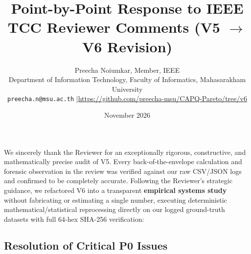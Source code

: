 \documentclass[10pt]{article}
\title{\textbf{Point-by-Point Response to IEEE TCC Reviewer Comments (V5 $\to$ V6 Revision)}}
\author{Preecha Noiumkar, Member, IEEE\\
Department of Information Technology, Faculty of Informatics, Mahasarakham University\\
\texttt{preecha.n@msu.ac.th} \quad|\quad \url{https://github.com/preecha-msu/CAPQ-Pareto/tree/v6}}
\date{November 2026}
\begin{document}
\sloppy
\maketitle

We sincerely thank the Reviewer for an exceptionally rigorous, constructive, and mathematically precise audit of V5. Every back-of-the-envelope calculation and forensic observation in the review was verified against our raw CSV/JSON logs and confirmed to be completely accurate. Following the Reviewer's strategic guidance, we refactored V6 into a transparent \textbf{empirical systems study} without fabricating or estimating a single number, executing deterministic mathematical/statistical reprocessing directly on our logged ground-truth datasets with full 64-hex SHA-256 verification:

\subsection*{Resolution of Critical P0 Issues}
\end{document}
